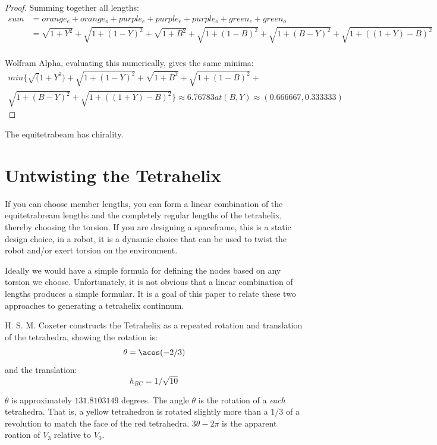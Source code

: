 \documentclass[11pt]{article}
\begin{document}
\begin{proof}
  Summing together all lengths:
  \begin{align*}
  sum &= orange_e + orange_o + purple_e + purple_e + purple_o + green_e + green_o \\    
  &= \sqrt{1 + Y^2} + \sqrt{1 + (1-Y)^2} + \sqrt{1 + B^2} + \sqrt{1+ (1-B)^2} +  \sqrt{1 + (B - Y)^2} +  \sqrt{1 + ((1+Y) - B)^2} \\
  \end{align*} 

  Wolfram Alpha, evaluating this numerically, gives the same minima:
\begin{align*}
  min\{\sqrt(1 + Y^2) + \sqrt{1 + (1 - Y)^2} + \sqrt{1 + B^2} + \sqrt{1 + (1 - B)^2} + \\
    \sqrt{1 + (B - Y)^2} + \sqrt{1 + ((1 + Y) - B)^2}\} \approx 6.76783 at (B, Y) \approx (0.666667, 0.333333)
\end{align*}
  
\end{proof}

The equitetrabeam has chirality.

\section{Untwisting the Tetrahelix}

If you can choose member lengths, you can form a linear combination of the equitetrabream lengths and the completely regular
lengths of the tetrahelix, thereby choosing the torsion.  If you are designing a spaceframe, this is a static design choice,
in a robot, it is a dynamic choice that can be used to twist the robot and/or exert torsion on the environment.

Ideally we would have a simple formula for defining the nodes based on any torsion we choose.
Unfortunately, it is not obvious that a linear combination of lengths produces a simple formular.
It is a goal of this paper to relate these two approaches to generating a tetrahelix continnum.

H. S. M. Coxeter constructs the Tetrahelix as a repeated rotation and translation of the tetrahedra, showing the
rotation is:
\[
\theta = \acos(-2/3) 
\]
and the translation:
\[
h_{BC} = 1/\sqrt{10}
\]


$\theta$ is approximately $131.8103149$ degrees.
The angle $\theta$ is the rotation of a \emph{each} tetrahedra.
That is, a yellow tetrahedron is rotated slightly more than a $1/3$ of a revolution to match the face of the red tetrahedra.
$3 \theta - 2\pi$ is the apparent roation of $V_3$ relative to $V_0$.
\end{document}
